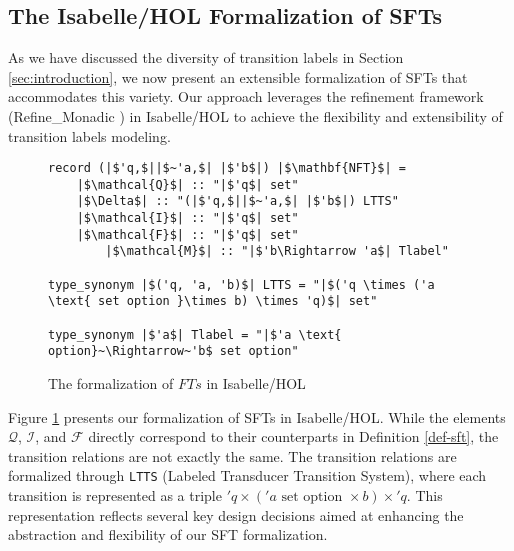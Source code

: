 \documentclass[a4paper,UKenglish,cleveref, autoref, anonymous, thm-restate]{lipics-v2021}
\begin{document}





\subsection{The Isabelle/HOL Formalization of SFTs}

As we have discussed the diversity of transition labels in Section \ref{sec:introduction}, we now present an extensible formalization of SFTs that accommodates this variety. Our approach leverages the refinement framework (Refine\_Monadic \cite{Refine_Monadic-AFP}) in Isabelle/HOL to achieve the flexibility and extensibility of transition labels modeling.

\begin{figure}[hbt!]
	\begin{lstlisting}
record (|$'q,$||$~'a,$| |$'b$|) |$\mathbf{NFT}$| =
	|$\mathcal{Q}$| :: "|$'q$| set"
	|$\Delta$| :: "(|$'q,$||$~'a,$| |$'b$|) LTTS"
	|$\mathcal{I}$| :: "|$'q$| set"
	|$\mathcal{F}$| :: "|$'q$| set"
        |$\mathcal{M}$| :: "|$'b\Rightarrow 'a$| Tlabel"
        
type_synonym |$('q, 'a, 'b)$| LTTS = "|$('q \times ('a \text{ set option }\times b) \times 'q)$| set"

type_synonym |$'a$| Tlabel = "|$'a \text{ option}~\Rightarrow~'b$ set option"
	\end{lstlisting}
\caption{The formalization of $FTs$ in Isabelle/HOL}
\label{fig-def-FT}
\end{figure}

Figure \ref{fig-def-FT} presents our formalization of SFTs in Isabelle/HOL. While the elements $\mathcal{Q}$, $\mathcal{I}$, and $\mathcal{F}$ directly correspond to their counterparts in Definition \ref{def-sft}, the transition relations are not exactly the same.
%
The transition relations are formalized through \texttt{LTTS} (Labeled Transducer Transition System), where each transition is represented as a triple $'q \times ('a \text{ set option }\times b) \times 'q$. This representation reflects several key design decisions aimed at enhancing the abstraction and flexibility of our SFT formalization.
\end{document}
